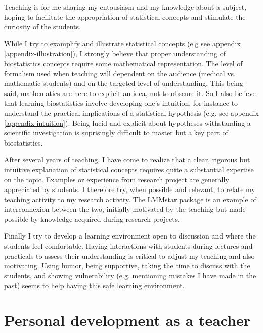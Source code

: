 \documentclass[12pt]{article}
\begin{document}
Teaching is for me sharing my entousiasm and my knowledge about a
subject, hoping to facilitate the appropriation of statistical
concepts and stimulate the curiosity of the students.

\bigskip

While I try to examplify and illustrate statistical concepts (e.g see
appendix \ref{appendix-illustration}), I strongly believe that proper
understanding of biostatistics concepts require some mathematical
representation. The level of formalism used when teaching will
dependent on the audience (medical vs. mathematic students) and on the
targeted level of understanding. This being said, mathematics are here
to explicit an idea, not to obscure it. So I also believe that
learning biostatistics involve developing one's intuition, for instance
to understand the practical implications of a statistical hypothesis
(e.g. see appendix \ref{appendix-intuition}). Being lucid and explicit
about hypotheses withstanding a scientific investigation is
suprisingly difficult to master but a key part of biostatistics.

\bigskip

After several years of teaching, I have come to realize that a clear,
rigorous but intuitive explanation of statistical concepts requires
quite a substantial expertise on the topic. Examples or experience
from research project are generally appreciated by students. I
therefore try, when possible and relevant, to relate my teaching
activity to my research activity. The LMMstar package is an example of
interconnexion between the two, initially motivated by the teaching
but made possible by knowledge acquired during research projects.

\bigskip

Finally I try to develop a learning environment open to discussion and
where the students feel comfortable. Having interactions with students
during lectures and practicals to assess their understanding is
critical to adjust my teaching and also motivating. Using humor, being
supportive, taking the time to discuss with the students, and showing
vulnerability (e.g. mentioning mistakes I have made in the past) seems
to help having this safe learning environment.




\section{Personal development as a teacher}
\label{sec:org489c324}
\end{document}
